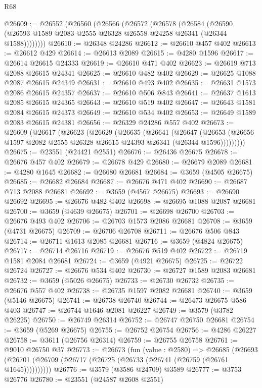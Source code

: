 \begin{lexlean}{R68}
\begin{coremodule}
@26609 := @26552
    (@26560
      (@26566
        (@26572
          (@26578
            (@26584
              (@26590 (@26593 @1589 @2083 @2555 @26328 @26558 @24258 @26341 (@26344 @1588))))))))
@26610 := @26348 @24286
@26612 := @26610 @457 @402
@26613 := @26612 @429
@26614 := @26613 @2089
@26615 := @4280 @1596
@26617 := @26614 @26615 @24333
@26619 := @26610 @471 @402
@26623 := @26619 @713 @2088 @26615 @24341
@26625 := @26610 @482 @402
@26629 := @26625 @1088 @2087 @26615 @24349
@26631 := @26610 @493 @402
@26635 := @26631 @1573 @2086 @26615 @24357
@26637 := @26610 @506 @843
@26641 := @26637 @1613 @2085 @26615 @24365
@26643 := @26610 @519 @402
@26647 := @26643 @1581 @2084 @26615 @24373
@26649 := @26610 @534 @402
@26653 := @26649 @1589 @2083 @26615 @24381
@26656 := @26329 @24286 @557 @402
@26673 := @26609
    (@26617
      (@26623
        (@26629
          (@26635
            (@26641
              (@26647
                (@26653 (@26656 @1597 @2082 @2555 @26328 @26615 @24393 @26341 (@26344 @1596)))))))))
@26675 := @23551 (@24421 @2551)
@26676 := @26436 @26675
@26678 := @26676 @457 @402
@26679 := @26678 @429
@26680 := @26679 @2089
@26681 := @4280 @1645
@26682 := @26680 @26681
@26684 := @3659 (@4505 @26675)
@26685 := @26682 @26684
@26687 := @26676 @471 @402
@26690 := @26687 @713 @2088 @26681
@26692 := @3659 (@4567 @26675)
@26693 := @26690 @26692
@26695 := @26676 @482 @402
@26698 := @26695 @1088 @2087 @26681
@26700 := @3659 (@4639 @26675)
@26701 := @26698 @26700
@26703 := @26676 @493 @402
@26706 := @26703 @1573 @2086 @26681
@26708 := @3659 (@4731 @26675)
@26709 := @26706 @26708
@26711 := @26676 @506 @843
@26714 := @26711 @1613 @2085 @26681
@26716 := @3659 (@4824 @26675)
@26717 := @26714 @26716
@26719 := @26676 @519 @402
@26722 := @26719 @1581 @2084 @26681
@26724 := @3659 (@4921 @26675)
@26725 := @26722 @26724
@26727 := @26676 @534 @402
@26730 := @26727 @1589 @2083 @26681
@26732 := @3659 (@5026 @26675)
@26733 := @26730 @26732
@26735 := @26676 @557 @402
@26738 := @26735 @1597 @2082 @26681
@26740 := @3659 (@5146 @26675)
@26741 := @26738 @26740
@26744 := @26473 @26675 @586 @403
@26747 := @26744 @1646 @2081 @26227
@26749 := @3579 (@3782 @26225)
@26750 := @26749 @26314
@26752 := @26747 @26750 @26681
@26754 := @3659 (@5269 @26675)
@26755 := @26752 @26754
@26756 := @4286 @26227
@26758 := @3611 (@26756 @26314)
@26759 := @26755 @26758
@26761 := @9010 @26750 @37
@26773 := @26673
    (fun (value : @2580) =>
    @26685 (@26693 (@26701 (@26709 (@26717 (@26725 (@26733 (@26741 (@26759 (@26761 @1645))))))))))
@26776 := @3579 (@3586 @24709) @3589
@26777 := @3753 @26776
@26780 := @23551 (@24587 @2608 @2551)

\end{coremodule}
\end{lexlean}
